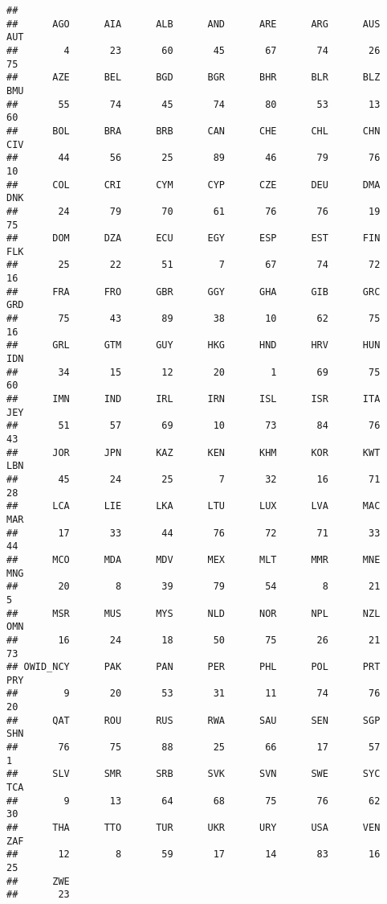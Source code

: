 \documentclass[
]{article}
\begin{document}
\begin{verbatim}
## 
##      AGO      AIA      ALB      AND      ARE      ARG      AUS      AUT 
##        4       23       60       45       67       74       26       75 
##      AZE      BEL      BGD      BGR      BHR      BLR      BLZ      BMU 
##       55       74       45       74       80       53       13       60 
##      BOL      BRA      BRB      CAN      CHE      CHL      CHN      CIV 
##       44       56       25       89       46       79       76       10 
##      COL      CRI      CYM      CYP      CZE      DEU      DMA      DNK 
##       24       79       70       61       76       76       19       75 
##      DOM      DZA      ECU      EGY      ESP      EST      FIN      FLK 
##       25       22       51        7       67       74       72       16 
##      FRA      FRO      GBR      GGY      GHA      GIB      GRC      GRD 
##       75       43       89       38       10       62       75       16 
##      GRL      GTM      GUY      HKG      HND      HRV      HUN      IDN 
##       34       15       12       20        1       69       75       60 
##      IMN      IND      IRL      IRN      ISL      ISR      ITA      JEY 
##       51       57       69       10       73       84       76       43 
##      JOR      JPN      KAZ      KEN      KHM      KOR      KWT      LBN 
##       45       24       25        7       32       16       71       28 
##      LCA      LIE      LKA      LTU      LUX      LVA      MAC      MAR 
##       17       33       44       76       72       71       33       44 
##      MCO      MDA      MDV      MEX      MLT      MMR      MNE      MNG 
##       20        8       39       79       54        8       21        5 
##      MSR      MUS      MYS      NLD      NOR      NPL      NZL      OMN 
##       16       24       18       50       75       26       21       73 
## OWID_NCY      PAK      PAN      PER      PHL      POL      PRT      PRY 
##        9       20       53       31       11       74       76       20 
##      QAT      ROU      RUS      RWA      SAU      SEN      SGP      SHN 
##       76       75       88       25       66       17       57        1 
##      SLV      SMR      SRB      SVK      SVN      SWE      SYC      TCA 
##        9       13       64       68       75       76       62       30 
##      THA      TTO      TUR      UKR      URY      USA      VEN      ZAF 
##       12        8       59       17       14       83       16       25 
##      ZWE 
##       23
\end{verbatim}
\end{document}
